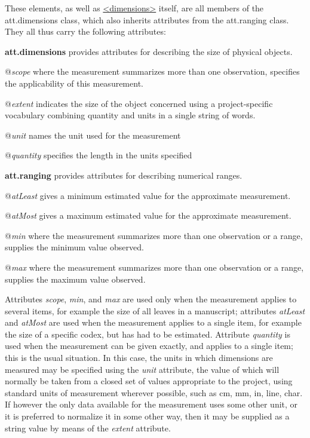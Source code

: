 \par
These elements, as well as \hyperref[TEI.dimensions]{<dimensions>} itself, are all members of the \textsf{att.dimensions} class, which also inherits attributes from the \textsf{att.ranging} class. They all thus carry the following attributes: 
\begin{sansreflist}
  
\item [\textbf{att.dimensions}] provides attributes for describing the size of physical objects.\hfil\\[-10pt]\begin{sansreflist}
    \item[@{\itshape scope}]
  where the measurement summarizes more than one observation, specifies the applicability of this measurement.
    \item[@{\itshape extent}]
  indicates the size of the object concerned using a project-specific vocabulary combining quantity and units in a single string of words.
    \item[@{\itshape unit}]
  names the unit used for the measurement
    \item[@{\itshape quantity}]
  specifies the length in the units specified
\end{sansreflist}  
\item [\textbf{att.ranging}] provides attributes for describing numerical ranges.\hfil\\[-10pt]\begin{sansreflist}
    \item[@{\itshape atLeast}]
  gives a minimum estimated value for the approximate measurement.
    \item[@{\itshape atMost}]
  gives a maximum estimated value for the approximate measurement.
    \item[@{\itshape min}]
  where the measurement summarizes more than one observation or a range, supplies the minimum value observed.
    \item[@{\itshape max}]
  where the measurement summarizes more than one observation or a range, supplies the maximum value observed.
\end{sansreflist}  
\end{sansreflist}
\par
Attributes {\itshape scope}, {\itshape min}, and {\itshape max} are used only when the measurement applies to several items, for example the size of all leaves in a manuscript; attributes {\itshape atLeast} and {\itshape atMost} are used when the measurement applies to a single item, for example the size of a specific codex, but has had to be estimated. Attribute {\itshape quantity} is used when the measurement can be given exactly, and applies to a single item; this is the usual situation. In this case, the units in which dimensions are measured may be specified using the {\itshape unit} attribute, the value of which will normally be taken from a closed set of values appropriate to the project, using standard units of measurement wherever possible, such as cm, mm, in, line, char. If however the only data available for the measurement uses some other unit, or it is preferred to normalize it in some other way, then it may be supplied as a string value by means of the {\itshape extent} attribute.\par
